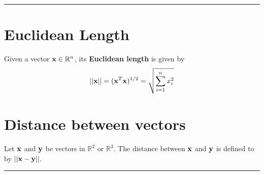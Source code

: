 \rule[0.01in]{\textwidth}{0.0025in}



\section{Euclidean Length}

Given a vector ${\bf x} \in \mathbb{R}^n$, its \textbf{Euclidean length} is given by
\[  || {\bf x} || = ({\bf x}^T {\bf x})^{1/2} = \sqrt{\sum_{i=1}^n x_i^2} \]







\section{Distance between vectors}


\begin{definition}
	Let ${\bf x}$ and ${\bf y}$  be vectors in $\mathbb{R}^2$ or $\mathbb{R}^3$.  The distance between ${\bf x}$ and ${\bf y}$ is defined to by $|| {\bf x} - {\bf y} ||$.
	
\end{definition}
\rule[0.01in]{\textwidth}{0.0025in}






